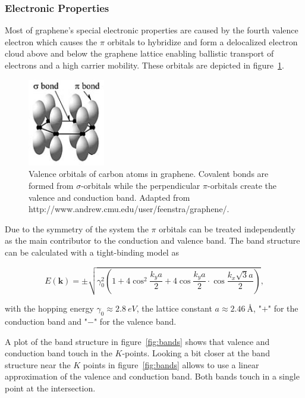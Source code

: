 \newpage

\subsubsection{Electronic Properties}

Most of graphene's special electronic properties are caused by the fourth valence electron which causes the $\pi$ orbitals to hybridize and form a delocalized electron cloud above and below the graphene lattice enabling ballistic transport of electrons and a high carrier mobility\cite{carrier}. These orbitals are depicted in figure~\ref{fig:orbitals}.

\begin{figure}[!h]
  \centering
  \includegraphics[width=0.3\textwidth]{./images/orbitals.jpg}
  \caption{Valence orbitals of carbon atoms in graphene. Covalent bonds are formed from $\sigma$-orbitals while the perpendicular $\pi$-orbitals create the valence and conduction band. Adapted from http://www.andrew.cmu.edu/user/feenstra/graphene/\mcite. }
  \label{fig:orbitals}
\end{figure}

Due to the symmetry of the system the $\pi$ orbitals can be treated independently as the main contributor to the conduction and valence band. The band structure can be calculated with a tight-binding model as\cite{dispersion}

\begin{equation}
  E(\mathbf{k})=\pm\sqrt{\gamma_0^2\left(1+4\cos^2\frac{k_ya}{2}+4\cos\frac{k_ya}{2}\cdot\cos\frac{k_x\sqrt{3}a}{2}\right)},
  \label{eq:dispersion}
\end{equation}

with the hopping energy $\gamma_0\approx\SI{2.8}{eV}$\cite{dispersion}, the lattice constant $a\approx\SI{2.46}{Å}$, "$+$" for the conduction band and "$-$" for the valence band.

A plot of the band structure in figure~\ref{fig:bands} shows that valence and conduction band touch in the $K$-points. Looking a bit closer at the band structure near the $K$ points in figure~\ref{fig:bands} allows to use a linear approximation of the valence and conduction band. Both bands touch in a single point at the intersection.

